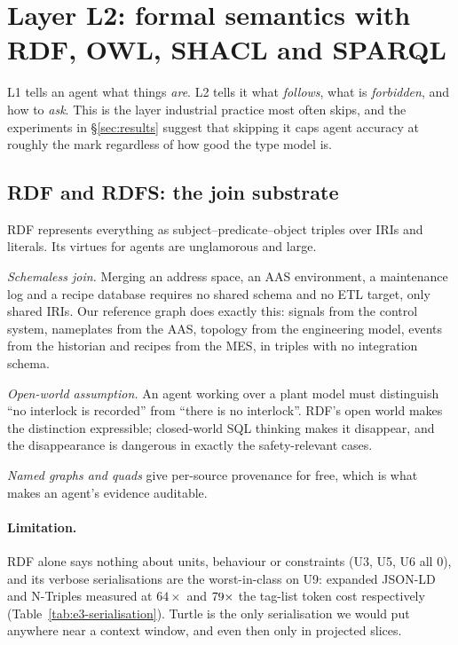 \section{Layer L2: formal semantics with RDF, OWL, SHACL and SPARQL}
\label{sec:layer2}

L1 tells an agent what things \emph{are}. L2 tells it what \emph{follows}, what
is \emph{forbidden}, and how to \emph{ask}. This is the layer
industrial practice most often skips, and the experiments in
\S\ref{sec:results} suggest that skipping it caps agent accuracy at roughly the
\CeilingCTwo{} mark regardless of how good the type model is.

\subsection{RDF and RDFS: the join substrate}

RDF \cite{w3c2014rdf} represents everything as subject--predicate--object
triples over IRIs and literals. Its virtues for agents are unglamorous and large.

\emph{Schemaless join.} Merging an \opcua{} address space, an AAS environment, a
maintenance log and a recipe database requires no shared schema and no ETL
target, only shared IRIs. Our reference graph does exactly this: signals from
the control system, nameplates from the AAS, topology from the engineering model,
events from the historian and recipes from the MES, in \NTriples{} triples with
no integration schema.

\emph{Open-world assumption.} An agent working over a plant model must
distinguish ``no interlock is recorded'' from ``there is no interlock''. RDF's
open world makes the distinction expressible; closed-world SQL thinking makes it
disappear, and the disappearance is dangerous in exactly the safety-relevant
cases.

\emph{Named graphs and quads} give per-source provenance for free, which is what
makes an agent's evidence auditable.

\paragraph{Limitation.} RDF alone says nothing about units, behaviour or
constraints (U3, U5, U6 all $0$), and its verbose serialisations are the
worst-in-class on U9: expanded JSON-LD and N-Triples measured at
$64\times$ and $79\times$ the tag-list token cost respectively
(Table~\ref{tab:e3-serialisation}). Turtle is the only serialisation we would
put anywhere near a context window, and even then only in projected slices.

